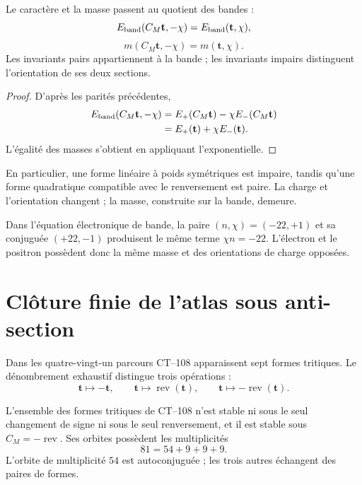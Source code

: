 \begin{theorem}
\label{thm:principio-conjugacion-masa-banda} Le caractère et la masse passent au quotient des bandes :
\[
E_{\rm band}(C_M\mathbf t,-\chi)
=E_{\rm band}(\mathbf t,\chi),
\]
\[
\boxed{
m(C_M\mathbf t,-\chi)=m(\mathbf t,\chi).}
\]
Les invariants pairs appartiennent à la bande ; les invariants impairs distinguent l’orientation de ses deux sections.
\end{theorem}

\begin{proof}
D’après les parités précédentes,
\[
\begin{aligned}
E_{\rm band}(C_M\mathbf t,-\chi)
&=E_+(C_M\mathbf t)-\chi E_-(C_M\mathbf t)\\
&=E_+(\mathbf t)+\chi E_-(\mathbf t).
\end{aligned}
\]
L’égalité des masses s’obtient en appliquant l’exponentielle.
\end{proof}

En particulier, une forme linéaire à poids symétriques est impaire, tandis qu’une forme quadratique compatible avec le renversement est paire. La charge et l’orientation changent ; la masse, construite sur la bande, demeure.

\begin{corollary}
\label{cor:electron-positron-banda} Dans l’équation électronique de bande, la paire \((n,\chi)=(-22,+1)\) et sa conjuguée \((+22,-1)\) produisent le même terme \(\chi n=-22\). L’électron et le positron possèdent donc la même masse et des orientations de charge opposées.
\end{corollary}

\section{Clôture finie de l’atlas sous anti-section}

Dans les quatre-vingt-un parcours CT--108 apparaissent sept formes tritiques. Le dénombrement exhaustif distingue trois opérations :
\[
\mathbf t\longmapsto-\mathbf t,\qquad
\mathbf t\longmapsto\operatorname{rev}(\mathbf t),\qquad
\mathbf t\longmapsto-\operatorname{rev}(\mathbf t).
\]

\begin{proposition}
\label{prop:cierre-antiseccion-ct108} L’ensemble des formes tritiques de CT--108 n’est stable ni sous le seul changement de signe ni sous le seul renversement, et il est stable sous \(C_M=-\operatorname{rev}\). Ses orbites possèdent les multiplicités
\[
\boxed{81=54+9+9+9.}
\]
L’orbite de multiplicité \(54\) est autoconjuguée ; les trois autres échangent des paires de formes.
\end{proposition}

